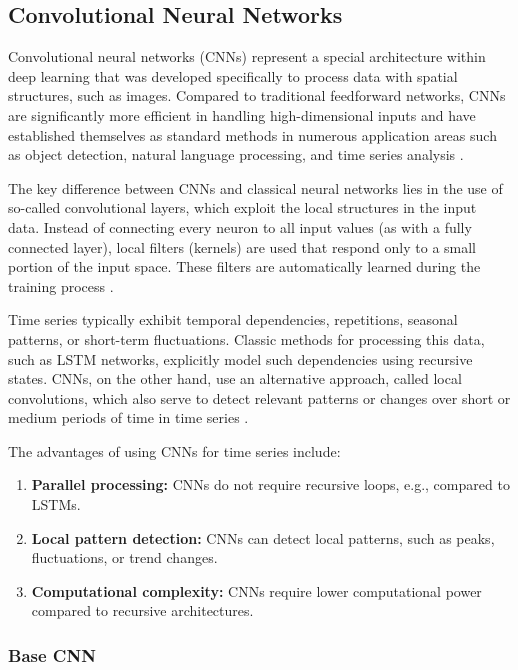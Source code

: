 \subsection{Convolutional Neural Networks}
\label{chap:cnn}

Convolutional neural networks (CNNs) represent a special architecture within deep learning that was developed specifically to process data with spatial structures, such as images.
Compared to traditional feedforward networks, CNNs are significantly more efficient in handling high-dimensional inputs and have established themselves as standard methods in numerous application areas such as object detection, natural language processing, and time series analysis \cite{cnn-for-time-series}.

The key difference between CNNs and classical neural networks lies in the use of so-called convolutional layers, which exploit the local structures in the input data.
Instead of connecting every neuron to all input values (as with a fully connected layer), local filters (kernels) are used that respond only to a small portion of the input space.
These filters are automatically learned during the training process \cite{cnn-for-time-series}.

Time series typically exhibit temporal dependencies, repetitions, seasonal patterns, or short-term fluctuations.
Classic methods for processing this data, such as LSTM networks, explicitly model such dependencies using recursive states.
CNNs, on the other hand, use an alternative approach, called local convolutions, which also serve to detect relevant patterns or changes over short or medium periods of time in time series \cite{cnn-local-convolution}.

The advantages of using CNNs for time series include:

\begin{enumerate}
    \item \textbf{Parallel processing:} CNNs do not require recursive loops, e.g., compared to LSTMs.
    \item \textbf{Local pattern detection:} CNNs can detect local patterns, such as peaks, fluctuations, or trend changes.
    \item \textbf{Computational complexity:} CNNs require lower computational power compared to recursive architectures.
\end{enumerate}

\subsubsection{Base CNN}

